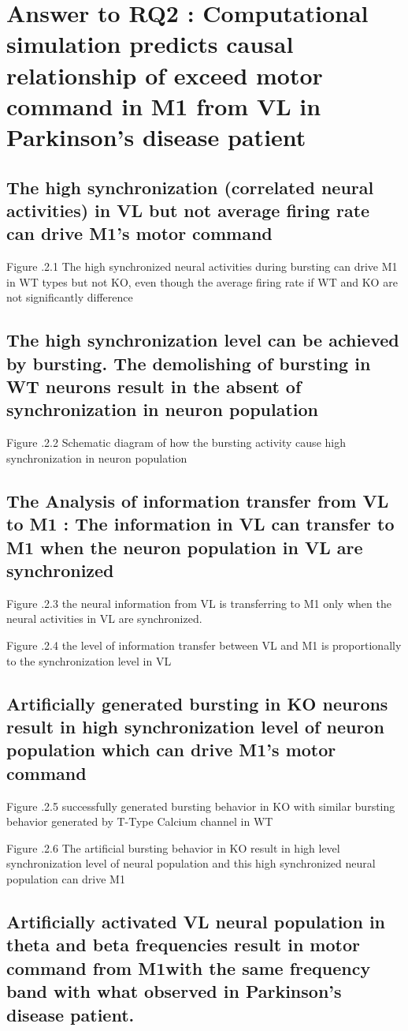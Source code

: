 \section{Answer to RQ2 : Computational simulation predicts causal relationship of exceed motor command in M1 from VL in Parkinson’s disease patient}

\subsection{ The high synchronization (correlated neural activities) in VL but not average firing rate can drive M1’s motor command}


Figure .2.1 The high synchronized neural activities during bursting can drive M1 in WT types but not KO, even though the average firing rate if WT and KO are not significantly difference


\subsection{  The high synchronization level can be achieved by bursting. The demolishing of bursting in WT neurons result in the absent of synchronization in neuron population}

Figure .2.2 Schematic diagram of how the bursting activity cause high synchronization in neuron population

\subsection{ The Analysis of information transfer from VL to M1 : The information in VL can transfer to M1 when the neuron population in VL are synchronized }

Figure .2.3 the neural information from VL is transferring to M1 only when the neural activities in VL are synchronized.

Figure .2.4 the level of information transfer between VL and M1 is proportionally to the synchronization level in VL

\subsection{ Artificially generated bursting in KO neurons result in high synchronization level of neuron population which can drive M1’s motor command
}
Figure .2.5 successfully generated bursting behavior in KO with similar bursting behavior generated by T-Type Calcium channel in WT

Figure .2.6 The artificial bursting behavior in KO result in high level synchronization level of neural population and this high synchronized neural 
population can drive M1

\subsection{ Artificially activated VL neural population in theta and beta frequencies result in motor command from M1with the same frequency band with what observed in Parkinson’s disease patient.}

